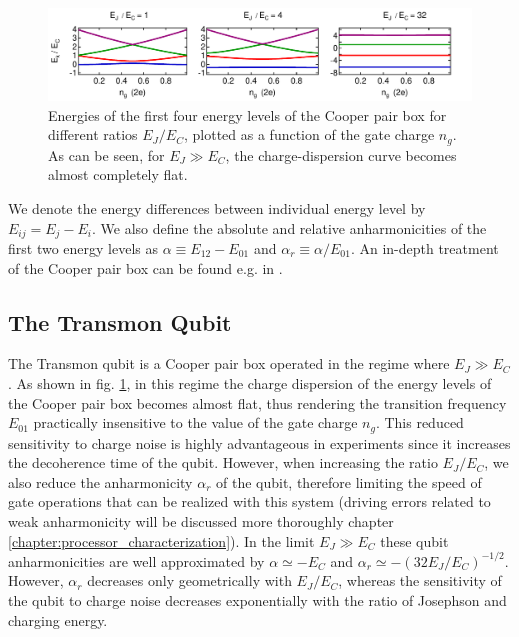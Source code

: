 \begin{figure}[ht!]
	\includegraphics[width=\textwidth]{"./material/mathematica/cooper_pair_box_energies"}
	\caption{Energies of the first four energy levels of the Cooper pair box for different ratios $E_J/E_C$, plotted as a function of the gate charge $n_g$. As can be seen, for $E_J \gg E_C$, the charge-dispersion curve becomes almost completely flat.}
	\label{fig:CooperPairBoxEnergies}
\end{figure}

We denote the energy differences between individual energy level by $E_{ij} = E_j - E_i$. We also define the absolute and relative anharmonicities of the first two energy levels as $\alpha \equiv E_{12}-E_{01}$ and $\alpha_r \equiv \alpha / E_{01}$. An in-depth treatment of the Cooper pair box can be found e.g. in \citep{cottet_implementation_2002}.

\subsection{The Transmon Qubit}

The Transmon qubit is a Cooper pair box operated in the regime where $E_J \gg E_C$ \cite{koch_charge-insensitive_2007,wallraff_strong_2004}. As shown in fig. \ref{fig:CooperPairBoxEnergies}, in this regime the charge dispersion of the energy levels of the Cooper pair box becomes almost flat, thus rendering the transition frequency $E_{01}$ practically insensitive to the value of the gate charge $n_g$. This reduced sensitivity to charge noise is highly advantageous in experiments since it increases the decoherence time of the qubit. However, when increasing the ratio $E_J/E_C$, we also reduce the anharmonicity $\alpha_r$ of the qubit, therefore limiting the speed of gate operations that can be realized with this system (driving errors related to weak anharmonicity will be discussed more thoroughly chapter \ref{chapter:processor_characterization}). In the limit $E_J \gg E_C$ these qubit anharmonicities are well approximated by $\alpha \simeq -E_C$ and $\alpha_r \simeq -(32 E_J / E_C)^{-1/2}$. However, $\alpha_r$ decreases only geometrically with $E_J/E_C$, whereas the sensitivity of the qubit to charge noise decreases exponentially with the ratio of Josephson and charging energy.


